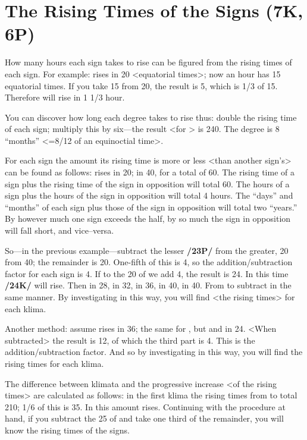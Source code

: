 \section{The Rising Times of the Signs (7K, 6P)}

How many hours each sign takes to rise can be figured from the rising times of each sign. For example: \Aries\xspace rises in 20 <equatorial times>; now an hour has 15 equatorial times. If you take 15 from 20, the result is 5, which is 1/3 of 15. Therefore \Aries\xspace will rise in 1 1/3 hour.

You can discover how long each degree takes to rise thus: double the rising time of each sign; multiply this by six—the result <for \Aries> is 240. The degree is 8 “months” <=8/12 of an equinoctial time>.

For each sign the amount its rising time is more or less <than another sign’s> can be found as follows: \Aries\xspace rises in 20; \Libra\xspace in 40, for a total of 60. The rising time of a sign plus the rising time of the sign in opposition will total 60. The hours of a sign plus the hours of the sign in opposition will total 4 hours. The “days” and “months” of each sign plus those of the sign in opposition will total two “years.” By however much one sign exceeds the half, by so much the sign in opposition will fall short, and vice–versa. 

So—in the previous example—subtract the lesser \textbf{/23P/} from the greater, 20 from 40; the remainder is 20. One-fifth of this is 4, so the addition/subtraction factor for each sign is 4. If to the 20 of \Aries\xspace we add 4, the result is 24. In this time \textbf{/24K/} \Taurus\xspace will rise. Then \Gemini\xspace in 28, \Cancer\xspace in 32, \Leo\xspace in 36, \Virgo\xspace in 40, \Libra\xspace in 40. From \Scorpio\xspace to \Pisces\xspace subtract in the same manner. By investigating in this way, you will find <the rising times> for each klima.

Another method: assume \Leo\xspace rises in 36; the same for \Scorpio, but \Taurus\xspace and \Aquarius\xspace in 24. <When subtracted> the result is 12, of which the third part is 4. This is the addition/subtraction factor. And so by investigating in this way, you will find the rising times for each klima.

The difference between klimata and the progressive increase <of the rising times> are calculated as follows: in the first klima the rising times from \Cancer\xspace to \Sagittarius\xspace total 210; 1/6 of this is 35. In this amount \Leo\xspace rises. Continuing with the procedure at hand, if you subtract the 25 of \Aquarius\xspace and take one third of the remainder, you will know the rising times of the signs.

